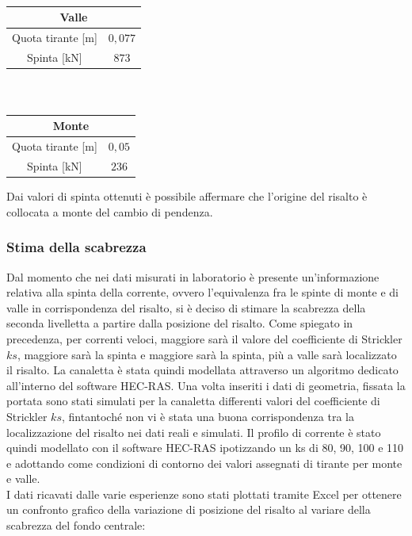 \documentclass[12pt]{article} %
\begin{document}
\begin{table}[H]
\sffamily\footnotesize
\begin{minipage}[b]{8.5cm}
    \centering
    \begin{tabular}{cc}
    \multicolumn{2}{c}{\textbf{Valle}}\\
        \hline
        Quota tirante [m] & $0,077$ \\
        Spinta [kN] & $873$\\
        \hline
    \end{tabular}
\end{minipage}
\ \hspace{2mm} \hspace{3mm} \
\begin{minipage}[b]{8.5cm}
    \centering
    \begin{tabular}{cc}
    \multicolumn{2}{c}{\textbf{Monte}}\\
        \hline
        Quota tirante [m] & $0,05$ \\
        Spinta [kN] & $236$ \\
        \hline
    \end{tabular}
\end{minipage}
\caption{}
\end{table}

\noindent Dai valori di spinta ottenuti è possibile affermare che l'origine del risalto è collocata a monte del cambio di pendenza.


\subsubsection{Stima della scabrezza}

\noindent Dal momento che nei dati misurati in laboratorio è presente un'informazione relativa alla spinta della corrente, ovvero l'equivalenza fra le spinte di monte e di valle in corrispondenza del risalto, si è deciso di stimare la scabrezza della seconda livelletta a partire dalla posizione del risalto. Come spiegato in precedenza, per correnti veloci, maggiore sarà il valore del coefficiente di Strickler $ks$, maggiore sarà la spinta e maggiore sarà la spinta, più a valle sarà localizzato il risalto.
La canaletta è stata quindi modellata attraverso un algoritmo dedicato all'interno del software HEC-RAS. 
Una volta inseriti i dati di geometria, fissata la portata sono stati simulati per la canaletta differenti valori del coefficiente di Strickler $ks$, fintantoché non vi è stata una buona corrispondenza tra la localizzazione del risalto nei dati reali e simulati.
Il profilo di corrente è stato quindi modellato con il software HEC-RAS ipotizzando un ks di 80, 90, 100 e 110 e adottando come condizioni di contorno dei valori assegnati di tirante per monte e valle.\\
I dati ricavati dalle varie esperienze sono stati plottati tramite Excel per ottenere un confronto grafico della variazione di posizione del risalto al variare della scabrezza del fondo centrale:
\end{document}
